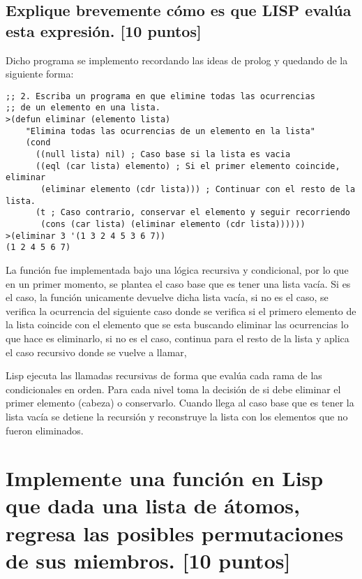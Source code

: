 \documentclass[11pt, letterpaper]{article}
\begin{document}
\subsection*{Explique brevemente cómo es que LISP evalúa esta expresión. [10 puntos]}

Dicho programa se implemento recordando las ideas de prolog y quedando de la siguiente forma:

\begin{itemize}
	\begin{verbatim}
;; 2. Escriba un programa en que elimine todas las ocurrencias
;; de un elemento en una lista.
>(defun eliminar (elemento lista)
    "Elimina todas las ocurrencias de un elemento en la lista"
    (cond
      ((null lista) nil) ; Caso base si la lista es vacia
      ((eql (car lista) elemento) ; Si el primer elemento coincide, eliminar 
       (eliminar elemento (cdr lista))) ; Continuar con el resto de la lista.
      (t ; Caso contrario, conservar el elemento y seguir recorriendo
       (cons (car lista) (eliminar elemento (cdr lista))))))
>(eliminar 3 '(1 3 2 4 5 3 6 7))
(1 2 4 5 6 7)
	\end{verbatim}
\end{itemize}

La función fue implementada bajo una lógica recursiva y condicional, por lo que en un primer momento, se plantea el caso base que es tener una lista vacía. Si es el caso, la función unicamente devuelve dicha lista vacía, si no es el caso, se verifica la ocurrencia del siguiente caso donde se verifica si el primero elemento de la lista coincide con el elemento que se esta buscando eliminar las ocurrencias lo que hace es eliminarlo, si no es el caso, continua para el resto de la lista y aplica el caso recursivo donde se vuelve a llamar,

Lisp ejecuta las llamadas recursivas de forma que evalúa cada rama de las condicionales en orden. Para cada nivel toma la decisión de si debe eliminar el primer elemento (cabeza) o conservarlo. Cuando llega al caso base que es tener la lista vacía se detiene la recursión y reconstruye la lista con los elementos que no fueron eliminados.


\newpage

\section{Implemente una función en Lisp que dada una lista de átomos, regresa las posibles permutaciones de sus miembros. [10 puntos]}
 
\end{document}
